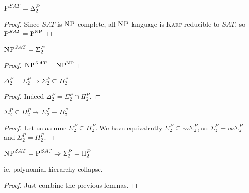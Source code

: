 \begin{lemma}
    $\P^{SAT} = \Delta_2^P$
\end{lemma}
\begin{proof}
    Since $SAT$ is $\NP$-complete, all $\NP$ language is \textsc{Karp}-reducible to $SAT$, so $\P^{SAT} = \P^\NP$
\end{proof}

\begin{lemma}
    $\NP^{SAT} = \Sigma_2^P$
\end{lemma}
\begin{proof}
    $\NP^{SAT} = \NP^\NP$
\end{proof}

\begin{lemma}
    $\Delta_2^P = \Sigma_2^P \Rightarrow \Sigma_2^P \subseteq \Pi_2^P$
\end{lemma}
\begin{proof}
    Indeed $\Delta_2^P = \Sigma_2^P \cap \Pi_2^P$.
\end{proof}

\begin{lemma}
    $\Sigma_2^P \subseteq \Pi_2^P \Rightarrow \Sigma_2^P = \Pi_2^P$
\end{lemma}
\begin{proof}
    Let us assume $\Sigma_2^P \subseteq \Pi_2^P$. We have equivalently $\Sigma_2^P \subseteq co\Sigma_2^P$, so $\Sigma_2^P = co\Sigma_2^P$ and $\Sigma_2^P = \Pi_2^P$.
\end{proof}

\begin{thm}
    $\NP^{SAT}=\P^{SAT} \Rightarrow \Sigma_2^P = \Pi_2^P$
    
    ie. polynomial hierarchy collapse.
\end{thm}
\begin{proof}
    Just combine the previous lemmas.
\end{proof}


